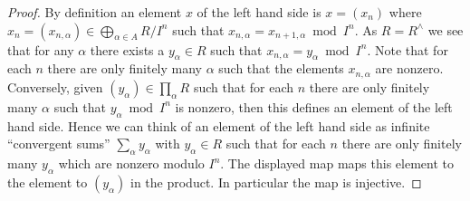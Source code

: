 \begin{proof}
By definition an element $x$ of the left hand side is $x = (x_n)$ where
$x_n = (x_{n, \alpha}) \in \bigoplus\nolimits_{\alpha \in A} R/I^n$
such that $x_{n, \alpha} = x_{n + 1, \alpha} \bmod I^n$. 
As $R = R^\wedge$ we see that for any $\alpha$ there exists a $y_\alpha \in R$
such that $x_{n, \alpha} = y_\alpha \bmod I^n$. Note that for each $n$ there
are only finitely many $\alpha$ such that the elements $x_{n, \alpha}$ are
nonzero. Conversely, given $(y_\alpha) \in \prod_\alpha R$ such that for each
$n$ there are only finitely many $\alpha$ such that $y_{\alpha} \bmod I^n$
is nonzero, then this defines an element of the left hand side.
Hence we can think of an element of the left hand side as infinite
``convergent sums'' $\sum_\alpha y_\alpha$ with $y_\alpha \in R$
such that for each $n$ there are only finitely many $y_\alpha$
which are nonzero modulo $I^n$. The displayed map maps this element
to the element to $(y_\alpha)$ in the product.
In particular the map is injective.


\end{proof}

